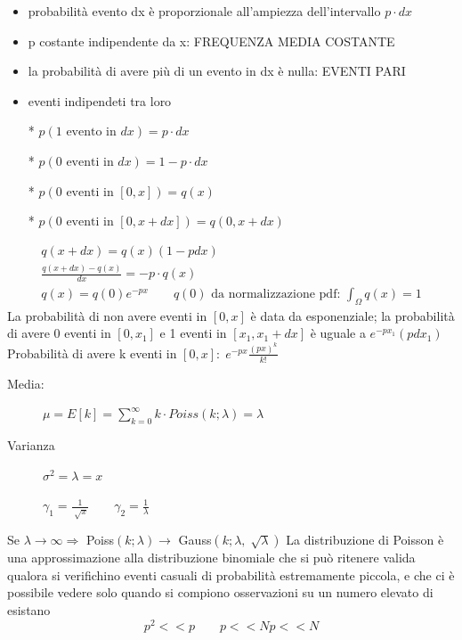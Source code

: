 \documentclass[12pt]{report}
\theoremstyle{remark}
\theoremstyle{theorem}
\begin{document}
\begin{itemize}
	\item probabilità evento dx è proporzionale all'ampiezza dell'intervallo $p\cdot dx$
 \item p costante indipendente da x: FREQUENZA MEDIA COSTANTE 	
 \item la probabilità di avere più di un evento in dx è nulla: EVENTI PARI
 \item eventi indipendeti tra loro 
\end{itemize}
\begin{itemize}
	\item [*] $p(1 \text{ evento in } dx) = p\cdot dx$
 \item [*] $p(0 \text{ eventi in }dx) = 1 -p\cdot dx$
 \item [*] $p(0 \text{ eventi in } [0,x]) = q(x)$
 \item [*] $p(0 \text{ eventi in } [0,x+dx]) = q(0,x+dx)$
\end{itemize}
\begin{gather*}
	q(x+dx) = q(x)(1-pdx) \\
	\frac{q(x+dx)-q(x)}{dx} = -p\cdot q(x) \\
	q(x) = q(0)e^{-px} \qquad q(0)\text{ da normalizzazione pdf: } \int_\Omega q(x) = 1
\end{gather*}
La probabilità di non avere eventi in $[0,x]$ è data da esponenziale; la probabilità di avere 0 eventi in $[0,x_1]$ e 1 eventi in $[x_1,x_1+dx]$ è uguale a $e^{-px_1}(pdx_1)$ \newline
Probabilità di avere k eventi in $[0,x]: \; e^{-px}\frac{{(px)}^k}{k!}$
\begin{description}
	\item[Media:] \; $\mu = E[k]= \displaystyle \sum_{k=0}^\infty k\cdot Poiss(k;\lambda) = \lambda$
 \item[Varianza] \; $\sigma^2 = \lambda=x$
 \item[] $\gamma_1 = \frac{1}{\sqrt[]{x}} \qquad \gamma_2 = \frac{1}{\lambda}$
\end{description}
Se $\lambda \to \infty \Rightarrow$ Poiss$(k;\lambda) \to$ Gauss$(k;\lambda,\sqrt[]{\lambda})$ \newline
La distribuzione di Poisson è una approssimazione alla distribuzione binomiale che si può ritenere valida qualora si verifichino eventi casuali di probabilità estremamente piccola, e che ci è possibile vedere solo quando si compiono osservazioni su un numero elevato di esistano
\[p^2 << p \qquad p<<Np<<N\]
\end{document}
